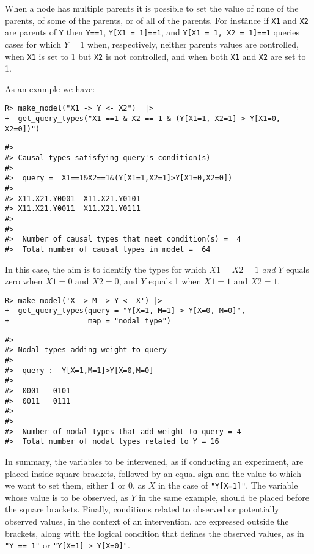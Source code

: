 \documentclass[
  11pt,
  article]{jss}
\begin{document}
When a node has multiple parents it is possible to set the value of none
of the parents, of some of the parents, or of all of the parents. For
instance if \texttt{X1} and \texttt{X2} are parents of \texttt{Y} then
\texttt{Y==1}, \texttt{Y{[}X1\ =\ 1{]}==1}, and
\texttt{Y{[}X1\ =\ 1,\ X2\ =\ 1{]}==1} queries cases for which \(Y=1\)
when, respectively, neither parents values are controlled, when
\texttt{X1} is set to 1 but \texttt{X2} is not controlled, and when both
\texttt{X1} and \texttt{X2} are set to 1.

As an example we have:

\begin{verbatim}
R> make_model("X1 -> Y <- X2")  |>
+  get_query_types("X1 ==1 & X2 == 1 & (Y[X1=1, X2=1] > Y[X1=0, X2=0])")
\end{verbatim}

\begin{verbatim}
#> 
#> Causal types satisfying query's condition(s)  
#> 
#>  query =  X1==1&X2==1&(Y[X1=1,X2=1]>Y[X1=0,X2=0]) 
#> 
#> X11.X21.Y0001  X11.X21.Y0101
#> X11.X21.Y0011  X11.X21.Y0111
#> 
#> 
#>  Number of causal types that meet condition(s) =  4
#>  Total number of causal types in model =  64
\end{verbatim}

In this case, the aim is to identify the types for which \(X1=X2=1\)
\emph{and} \(Y\) equals zero when \(X1 = 0\) and \(X2 = 0\), and \(Y\)
equals 1 when \(X1 = 1\) and \(X2 = 1\).

\begin{verbatim}
R> make_model('X -> M -> Y <- X') |> 
+  get_query_types(query = "Y[X=1, M=1] > Y[X=0, M=0]", 
+                  map = "nodal_type")
\end{verbatim}

\begin{verbatim}
#> 
#> Nodal types adding weight to query
#> 
#>  query :  Y[X=1,M=1]>Y[X=0,M=0] 
#> 
#>  0001   0101
#>  0011   0111
#> 
#> 
#>  Number of nodal types that add weight to query = 4
#>  Total number of nodal types related to Y = 16
\end{verbatim}

In summary, the variables to be intervened, as if conducting an
experiment, are placed inside square brackets, followed by an equal sign
and the value to which we want to set them, either 1 or 0, as \(X\) in
the case of \texttt{"Y{[}X=1{]}"}. The variable whose value is to be
observed, as \(Y\) in the same example, should be placed before the
square brackets. Finally, conditions related to observed or potentially
observed values, in the context of an intervention, are expressed
outside the brackets, along with the logical condition that defines the
observed values, as in \texttt{"Y\ ==\ 1"} or
\texttt{"Y{[}X=1{]}\ \textgreater{}\ Y{[}X=0{]}"}.
\end{document}
